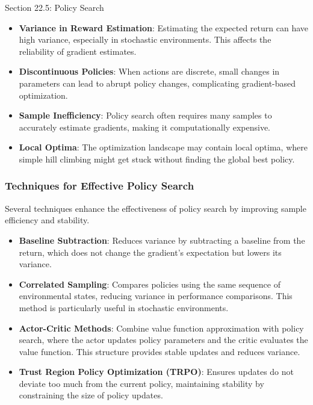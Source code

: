 \begin{notes}{Section 22.5: Policy Search}
\begin{highlight}
        \begin{itemize}
            \item \textbf{Variance in Reward Estimation}: Estimating the expected return can have high variance, especially in stochastic environments. This affects the reliability of gradient estimates.
            \item \textbf{Discontinuous Policies}: When actions are discrete, small changes in parameters can lead to abrupt policy changes, complicating gradient-based optimization.
            \item \textbf{Sample Inefficiency}: Policy search often requires many samples to accurately estimate gradients, making it computationally expensive.
            \item \textbf{Local Optima}: The optimization landscape may contain local optima, where simple hill climbing might get stuck without finding the global best policy.
        \end{itemize}
    
    \end{highlight}
    
    \subsubsection*{Techniques for Effective Policy Search}
    
    Several techniques enhance the effectiveness of policy search by improving sample efficiency and stability.
    
    \begin{highlight}
    
        \begin{itemize}
            \item \textbf{Baseline Subtraction}: Reduces variance by subtracting a baseline from the return, which does not change the gradient's expectation but lowers its variance.
            \item \textbf{Correlated Sampling}: Compares policies using the same sequence of environmental states, reducing variance in performance comparisons. This method is particularly useful in stochastic environments.
            \item \textbf{Actor-Critic Methods}: Combine value function approximation with policy search, where the actor updates policy parameters and the critic evaluates the value function. This structure 
            provides stable updates and reduces variance.
            \item \textbf{Trust Region Policy Optimization (TRPO)}: Ensures updates do not deviate too much from the current policy, maintaining stability by constraining the size of policy updates.
        \end{itemize}
    

\end{highlight}
\end{notes}
